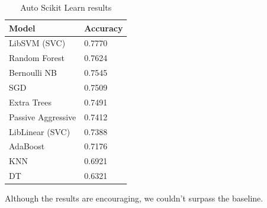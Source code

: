 \documentclass[conference]{IEEEtran}
\begin{document}
\begin{table}[htbp]
	\caption{Auto Scikit Learn results}
	\begin{center}
		\begin{tabular}{|l|l|}
			\hline
			\textbf{Model} & \textbf{Accuracy}\\ \hline
			LibSVM (SVC) & 0.7770 \\ \hline
			Random Forest & 0.7624 \\ \hline
			Bernoulli NB & 0.7545 \\ \hline
			SGD & 0.7509 \\ \hline
			Extra Trees & 0.7491 \\ \hline
			Passive Aggressive & 0.7412 \\ \hline
			LibLinear (SVC) & 0.7388 \\ \hline
			AdaBoost & 0.7176 \\ \hline
			KNN & 0.6921 \\ \hline
			DT & 0.6321 \\ \hline								
		\end{tabular}
		\label{tab2}
	\end{center}
\end{table}
Although the results are encouraging, we couldn’t surpass the baseline.
\end{document}
